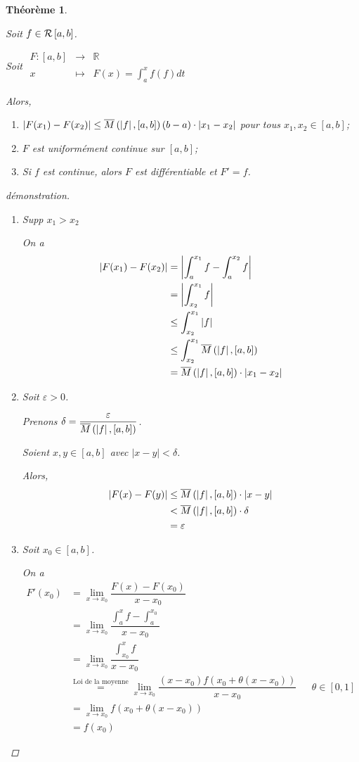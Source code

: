 \documentclass{report}
\newcommand*{\abs}[1]{\left| #1 \right|}
\newcommand*{\eps}{\varepsilon}
\newcommand*{\reels}{\mathbb{R}}
\newtheorem*{thm}{Th\'eor\`eme}
\theoremstyle{definition}
\theoremstyle{remark}
\begin{document}
	\begin{thm}
		~

		Soit $f \in \riemann$.

		Soit
		$\begin{array}{rcl}
			F:[a,b]&\to&\reels\\
			x&\mapsto&F(x) = \displaystyle\int_{a}^{x}f(f) dt
		\end{array}$

		Alors,
		\begin{enumerate}[label=\alph*)]
			\item $\abs{F(x_1)-F(x_2)} \leq \msup{\abs{f}}(b-a) \cdot \abs{x_1-x_2}$ pour tous $x_1,x_2 \in [a,b]$;
			\item $F$ est uniform\'ement continue sur $[a,b]$;
			\item Si $f$ est continue, alors $F$ est diff\'erentiable et $F'=f$.
		\end{enumerate}
		\begin{proof}[d\'emonstration]~

			\begin{enumerate}[label=\alph*)]
				\item Supp $x_1>x_2$

				On a
				\begin{align*}
					\abs{F(x_1)-F(x_2)}&= \abs{\int_{a}^{x_1}f - \int_{a}^{x_2}f}\\
					&= \abs{\int_{x_2}^{x_1}f}\\
					&\leq \int_{x_2}^{x_1}\abs{f}\\
					&\leq \int_{x_2}^{x_1}\msup{\abs{f}}\\
					&= \msup{\abs{f}} \cdot \abs{x_1-x_2}
				\end{align*}
				\item Soit $\eps>0$.

				Prenons $\delta = \dfrac{\eps}{\msup{\abs{f}}}$.

				Soient $x,y \in [a,b]$ avec $\abs{x-y}<\delta$.

				Alors,
				\begin{align*}
					\abs{F(x)-F(y)}&\leq \msup{\abs{f}} \cdot \abs{x-y}\\
					&< \msup{\abs{f}} \cdot \delta\\
					&= \eps
				\end{align*}
				\item Soit $x_0 \in [a,b]$.

				On a
				\begin{align*}
					F'(x_0)&= \lim_{x \to x_0}\dfrac{F(x)-F(x_0)}{x-x_0}\\
					&= \lim_{x \to x_0}\dfrac{\int_{a}^{x}f - \int_{a}^{x_0}}{x-x_0}\\
					&= \lim_{x \to x_0}\dfrac{\int_{x_0}^{x}f}{x-x_0}\\
					&\overset{\text{Loi de la moyenne}}{=} \lim_{x \to x_0}\dfrac{(x-x_0)f(x_0+\theta(x-x_0))}{x-x_0}&&\theta \in [0,1]\\
					&= \lim_{x \to x_0}f(x_0+\theta(x-x_0))\\
					&= f(x_0)
				\end{align*}
			\end{enumerate}
		\end{proof}
	\end{thm}
\end{document}
